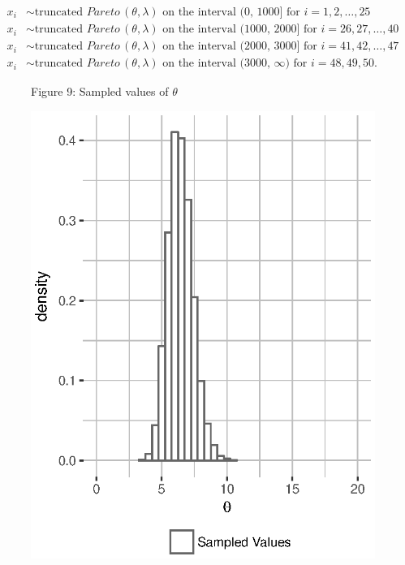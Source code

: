 \documentclass[11pt, oneside]{article}
\newcommand*{\figuretitle}[1]{
    {\centering
    \tiny{#1}
    \par\medskip}
}
\begin{document}
\begin{align}
x_i &\sim\text{truncated }Pareto\,(\theta, \lambda)\text{ on the interval (0, 1000] for $i=1,2,\ldots,25$}\label{eq:7}\\
x_i &\sim\text{truncated }Pareto\,(\theta, \lambda)\text{ on the interval (1000, 2000] for $i= 26,27,\ldots,40$}\label{eq:8}\\
x_i &\sim\text{truncated }Pareto\,(\theta, \lambda)\text{ on the interval (2000,  3000] for $i=41,42,\ldots,47$}\label{eq:9}\\
x_i &\sim\text{truncated }Pareto\,(\theta, \lambda)\text{ on the interval (3000, $\infty$) for $i=48,49,50$}\label{eq:10}.
\end{align}

\begin{figure}
   \figuretitle{Figure 9: Sampled values of $\theta$}
   \centering\includegraphics[width=\textwidth]{Figure9}\vspace{-50pt}
\end{figure}
\end{document}
